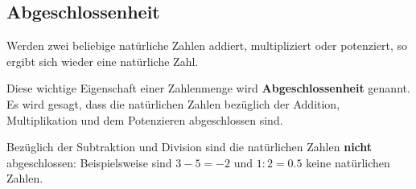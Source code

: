 \subsection{Abgeschlossenheit}

Werden zwei beliebige natürliche Zahlen addiert, multipliziert oder potenziert, so ergibt sich wieder eine natürliche Zahl.

Diese wichtige Eigenschaft einer Zahlenmenge wird \textbf{Abgeschlossenheit} genannt. Es wird gesagt, dass die natürlichen Zahlen bezüglich der Addition, Multiplikation und dem Potenzieren abgeschlossen sind.

Bezüglich der Subtraktion und Division sind die natürlichen Zahlen \textbf{nicht} abgeschlossen: Beispielsweise sind $3-5 = -2$ und $1:2 = 0.5$ keine natürlichen Zahlen.

